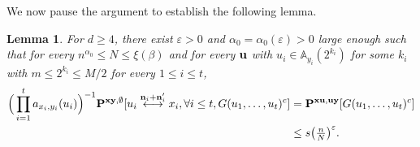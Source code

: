 \documentclass[a4paper,oneside,11pt]{article}
\newtheorem{lemma}[theorem]{Lemma}
\numberwithin{equation}{section}
\numberwithin{equation}{section}
\numberwithin{equation}{section}
\newcommand{\bbA}{\mathbb{A}}
\newcommand{\ep}{\varepsilon}
\newcommand{\n}{\mathbf{n}}
\begin{document}
We now pause the argument to establish the following lemma.
\begin{lemma}\label{lem:G}
For $d\ge4$, there exist $\ep>0$ and $\alpha_0=\alpha_0(\ep)>0$ large enough such that for every $n^{\alpha_0}\le N\le \xi(\beta)$ and for every ${\bf u}$ with $u_i\in \bbA_{y_i}(2^{k_i})$ for some $k_i$ with $m\le 2^{k_i}\le M/2$ for every $1\le i\le t$,
\begin{align}
\Big(\prod_{i=1}^ta_{x_i,y_i}(u_i)\Big)^{-1}{\bf P}^{{\bf xy},\emptyset}[u_i\stackrel{\n_i+\n'_i}\longleftrightarrow x_i,\forall i\le t,G(u_1,\dots,u_t)^c]
&={\bf P}^{{\bf xu},{\bf uy}}[G(u_1,\dots,u_t)^c]\nonumber\\
&\le s\big(\tfrac nN\big)^{\ep}.
\end{align}
\end{lemma}
\end{document}
